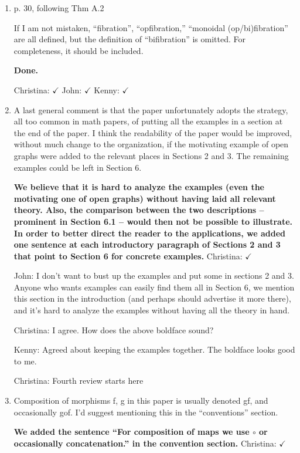 \documentclass[reqno]{amsart}
\def\chris{\color{purple} Christina: }
\def\john{\color{red} John: }
\def\kenny{\color{blue} Kenny: }
\begin{document}
\begin{enumerate}
\item p. 30, following Thm A.2

If I am not mistaken, “fibration”, “opfibration,” “monoidal (op/bi)fibration” are all defined, but the definition of “bifibration” is omitted. For 
completeness, it should be included.

{\bf Done.} 

{\chris $\checkmark$} {\john $\checkmark$}  {\kenny $\checkmark$}

\item A last general comment is that the paper unfortunately adopts the strategy, all too common in math papers, of putting all the examples in a 
section at 
the end of the paper. I think the readability of the paper would be improved, without much change to the organization, if the motivating example of 
open graphs were added to the relevant places in Sections 2 and 3. The remaining examples could be left in Section 6.

{\bf We believe that it is hard to analyze the examples (even the motivating one of open graphs) without having laid all relevant theory. Also, 
the comparison between the two descriptions -- prominent in Section 6.1 -- would then not be possible to illustrate. In order to 
better direct the reader to the applications, we added one sentence at each introductory paragraph of Sections 2 and 3 that point to Section 6 for 
concrete examples.} {\chris $\checkmark$}

{\john
I don't want to bust up the examples and put some in sections 2 and 3. Anyone who wants examples can easily find them all in Section 6, we mention 
this section in the introduction (and perhaps should advertise it more there), and it's hard to analyze the examples without having all the theory in 
hand.}

{\chris I agree. How does the above boldface sound?}

{\kenny Agreed about keeping the examples together. The boldface looks good to me.}

{\chris Fourth review starts here}
\item Composition of morphisms f, g in this paper is usually denoted gf, and occasionally gof. I’d suggest mentioning this in the “conventions” 
section.

{\bf We added the sentence ``For composition of maps we use $\circ$ or occasionally concatenation.'' in the convention section.} {\chris $\checkmark$}



\end{enumerate}
\end{document}
